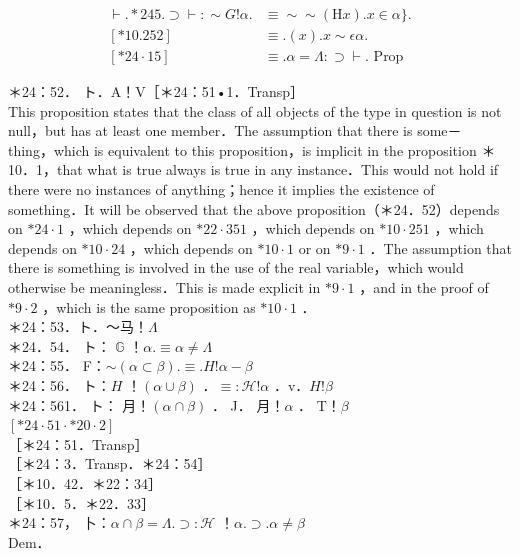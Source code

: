 \documentclass[10pt]{article}
\begin{document}
$$
\begin{aligned}
\vdash . * 245 . \supset \vdash: \sim G!\alpha . & \equiv \sim \sim(\mathrm{H} x) . x \in \alpha\} . \\
{[* 10.252] } & \equiv .(x) . x \sim \epsilon \alpha . \\
{[* 24 \cdot 15] } & \equiv . \alpha=\Lambda: \supset \vdash . \text { Prop }
\end{aligned}
$$

＊24：52． ト．A！V［＊24：51•1．Transp］\\
This proposition states that the class of all objects of the type in question is not null，but has at least one member．The assumption that there is some－\\
thing，which is equivalent to this proposition，is implicit in the proposition ＊10．1，that what is true always is true in any instance．This would not hold if there were no instances of anything；hence it implies the existence of something．It will be observed that the above proposition（＊24．52）depends on $* 24 \cdot 1$ ，which depends on $* 22 \cdot 351$ ，which depends on $* 10 \cdot 251$ ，which depends on $* 10 \cdot 24$ ，which depends on $* 10 \cdot 1$ or on $* 9 \cdot 1$ ．The assumption that there is something is involved in the use of the real variable，which would otherwise be meaningless．This is made explicit in $* 9 \cdot 1$ ，and in the proof of $* 9 \cdot 2$ ，which is the same proposition as $* 10 \cdot 1$ ．\\
＊24：53．ト．～马！$\Lambda$\\
＊24．54． ト： $\mathbb{G}$ ！$\alpha . \equiv \alpha \neq \Lambda$\\
＊24：55． F：$\sim(\alpha \subset \beta) . \equiv . H!\alpha-\beta$\\
＊24：56． ト：$H$ ！$(\alpha \cup \beta)$ ．$\equiv: \mathcal{H}!\alpha$ ．v．$H!\beta$\\
＊24：561． ト： 月！$(\alpha \cap \beta)$ ． J． 月！$\alpha$ ． T！$\beta$\\
$[* 24 \cdot 51 \cdot * 20 \cdot 2]$\\
［＊24：51．Transp］\\
［＊24：3．Transp．＊24：54］\\
［＊10．42．＊22：34］\\
［＊10．5．＊22．33］\\
＊24：57， 卜：$\alpha \cap \beta=\Lambda . \supset: \mathcal{H}$ ！$\alpha . \supset . \alpha \neq \beta$\\
Dem．
\end{document}
